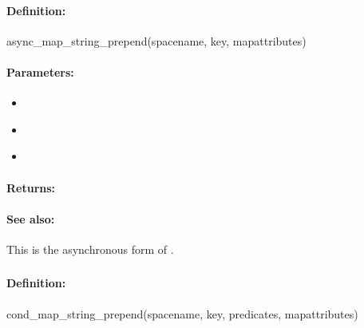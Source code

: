 \paragraph{Definition:}
\begin{rubycode}
async_map_string_prepend(spacename, key, mapattributes)
\end{rubycode}

\paragraph{Parameters:}
\begin{itemize}[noitemsep]
\item {}\\

\item {}\\

\item {}\\

\end{itemize}

\paragraph{Returns:}


\paragraph{See also:}  This is the asynchronous form of .

\pagebreak
\subsubsection{}
\label{api:ruby:cond_map_string_prepend}


\paragraph{Definition:}
\begin{rubycode}
cond_map_string_prepend(spacename, key, predicates, mapattributes)
\end{rubycode}

